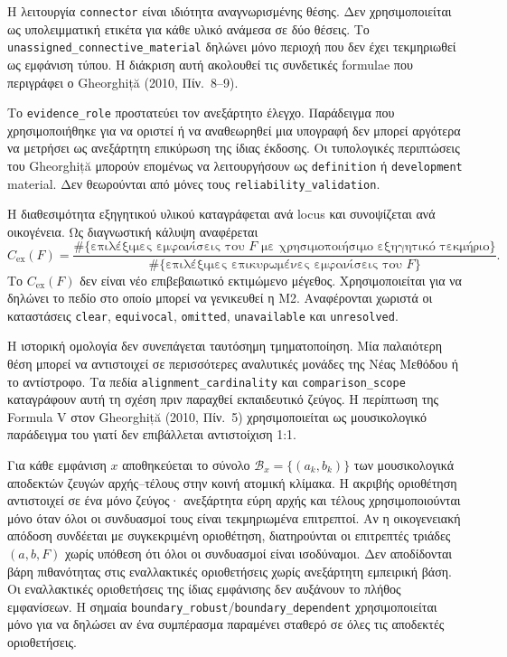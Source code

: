 \documentclass[11pt,a4paper]{article}
\begin{document}
Η λειτουργία \texttt{connector} είναι ιδιότητα αναγνωρισμένης θέσης. Δεν χρησιμοποιείται ως υπολειμματική ετικέτα για κάθε υλικό ανάμεσα σε δύο θέσεις. Το \texttt{unassigned\_connective\_material} δηλώνει μόνο περιοχή που δεν έχει τεκμηριωθεί ως εμφάνιση τύπου. Η διάκριση αυτή ακολουθεί τις συνδετικές formulae που περιγράφει ο Gheorghiță (2010, Πίν.~8--9).

Το \texttt{evidence\_role} προστατεύει τον ανεξάρτητο έλεγχο. Παράδειγμα που χρησιμοποιήθηκε για να οριστεί ή να αναθεωρηθεί μια υπογραφή δεν μπορεί αργότερα να μετρήσει ως ανεξάρτητη επικύρωση της ίδιας έκδοσης. Οι τυπολογικές περιπτώσεις του Gheorghiță μπορούν επομένως να λειτουργήσουν ως \texttt{definition} ή \texttt{development} material. Δεν θεωρούνται από μόνες τους \texttt{reliability\_validation}.

Η διαθεσιμότητα εξηγητικού υλικού καταγράφεται ανά locus και συνοψίζεται ανά οικογένεια. Ως διαγνωστική κάλυψη αναφέρεται
\[
C_{\mathrm{ex}}(F)=\frac{\#\{\text{επιλέξιμες εμφανίσεις του }F\text{ με χρησιμοποιήσιμο εξηγητικό τεκμήριο}\}}{\#\{\text{επιλέξιμες επικυρωμένες εμφανίσεις του }F\}}.
\]
Το $C_{\mathrm{ex}}(F)$ δεν είναι νέο επιβεβαιωτικό εκτιμώμενο μέγεθος. Χρησιμοποιείται για να δηλώνει το πεδίο στο οποίο μπορεί να γενικευθεί η M2. Αναφέρονται χωριστά οι καταστάσεις \texttt{clear}, \texttt{equivocal}, \texttt{omitted}, \texttt{unavailable} και \texttt{unresolved}.

Η ιστορική ομολογία δεν συνεπάγεται ταυτόσημη τμηματοποίηση. Μία παλαιότερη θέση μπορεί να αντιστοιχεί σε περισσότερες αναλυτικές μονάδες της Νέας Μεθόδου ή το αντίστροφο. Τα πεδία \texttt{alignment\_cardinality} και \texttt{comparison\_scope} καταγράφουν αυτή τη σχέση πριν παραχθεί εκπαιδευτικό ζεύγος. Η περίπτωση της Formula V στον Gheorghiță (2010, Πίν.~5) χρησιμοποιείται ως μουσικολογικό παράδειγμα του γιατί δεν επιβάλλεται αντιστοίχιση 1:1.

Για κάθε εμφάνιση $x$ αποθηκεύεται το σύνολο $\mathcal B_x=\{(a_k,b_k)\}$ των μουσικολογικά αποδεκτών ζευγών αρχής--τέλους στην κοινή ατομική κλίμακα. Η ακριβής οριοθέτηση αντιστοιχεί σε ένα μόνο ζεύγος· ανεξάρτητα εύρη αρχής και τέλους χρησιμοποιούνται μόνο όταν όλοι οι συνδυασμοί τους είναι τεκμηριωμένα επιτρεπτοί. Αν η οικογενειακή απόδοση συνδέεται με συγκεκριμένη οριοθέτηση, διατηρούνται οι επιτρεπτές τριάδες $(a,b,F)$ χωρίς υπόθεση ότι όλοι οι συνδυασμοί είναι ισοδύναμοι. Δεν αποδίδονται βάρη πιθανότητας στις εναλλακτικές οριοθετήσεις χωρίς ανεξάρτητη εμπειρική βάση. Οι εναλλακτικές οριοθετήσεις της ίδιας εμφάνισης δεν αυξάνουν το πλήθος εμφανίσεων. Η σημαία \texttt{boundary\_robust}/\texttt{boundary\_dependent} χρησιμοποιείται μόνο για να δηλώσει αν ένα συμπέρασμα παραμένει σταθερό σε όλες τις αποδεκτές οριοθετήσεις.
\end{document}
